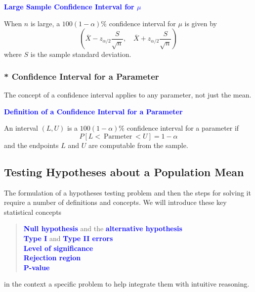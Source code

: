 \documentclass[12pt,openany]{book}
\theoremstyle{definition}
\begin{document}
	\begin{tcolorbox}[colback=white]\begin{center}
			\textcolor{blue}{\bf Large Sample Confidence Interval for $\mu$}
		\end{center}
		When $n$ is large, a $100(1-\alpha)\%$ confidence interval for $\mu$ is given by \[
		\left(\overline{X}-z_{\alpha/2}\frac{S}{\sqrt{n}},\quad\overline{X}+z_{\alpha/2}\frac{S}{\sqrt{n}} \right)
		\] where $S$ is the sample standard deviation.
	\end{tcolorbox}
	
	\subsubsection*{* Confidence Interval for a Parameter}
	The concept of a confidence interval applies to any parameter, not just the mean.
	\begin{tcolorbox}[colback=white]\begin{center}
			\textcolor{blue}{\bf Definition of a Confidence Interval for a Parameter}
		\end{center}
		An interval $(L, U)$ is a $100(1-\alpha)\%$ confidence interval for a parameter if \[
		P\left[L<\ \text{Parmeter}\ < U \right] = 1-\alpha
		\] and the endpoints $L$ and $U$ are computable from the sample.
	\end{tcolorbox}
	
	\subsection{Testing Hypotheses about a Population Mean}
	The formulation of a hypotheses testing problem and then the steps for solving it require a number of definitions and concepts. We will introduce these key statistical concepts \begin{quote}
		\textcolor{blue}{\bf Null hypothesis} and the \textcolor{blue}{\bf alternative hypothesis} \\
		\textcolor{blue}{\bf Type I} and \textcolor{blue}{\bf Type II errors} \\
		\textcolor{blue}{\bf Level of significance} \\
		\textcolor{blue}{\bf Rejection region} \\
		\textcolor{blue}{\bf P-value}
	\end{quote} in the context a specific problem to help integrate them with intuitive reasoning.
	
\end{document}
